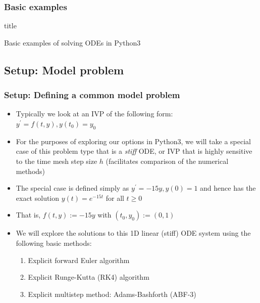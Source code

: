 \documentclass[usenames,svgnames,dvipsnames,10pt]{beamer}
\newcommand{\TitleBoxed}[1]{
     \begin{beamercolorbox}[sep=8pt,center,shadow=true,rounded=true]{title}
          \usebeamerfont{title}#1\vskip 0.6cm\par%
     \end{beamercolorbox}
}
\begin{document}
\begin{frame}
\frametitle{Basic examples} 

\TitleBoxed{
     \Large{\centerline{Basic examples of solving ODEs in Python3}}
}

\end{frame}

\subsection{Setup: Model problem}

\begin{frame}
\frametitle{Setup: Defining a common model problem}

\begin{itemize} 

\item Typically we look at an IVP of the following form: \\ 
      $y^{\prime} = f(t, y), y(t_0) = y_0$
\item For the purposes of exploring our options in Python3, we will take a 
      special case of this problem type that is a \emph{stiff} ODE, or IVP that is highly 
      sensitive to the time mesh step size $h$ (facilitates comparison of the numerical methods)
\item The special case is defined simply as $y^{\prime} = -15y, y(0) = 1$ and hence has the 
      exact solution $y(t) = e^{-15t}$ for all $t \geq 0$ 
\item That is, $f(t, y) := -15y$ with $(t_0, y_0) := (0, 1)$
\item We will explore the solutions to this 1D linear (stiff) ODE system using the 
      following basic methods: 
      \begin{enumerate}
      \item Explicit forward Euler algorithm 
      \item Explicit Runge-Kutta (RK4) algorithm 
      \item Explicit multistep method: Adams-Bashforth (ABF-$3$) 
      \end{enumerate} 

\end{itemize} 

\end{frame}
\end{document}
